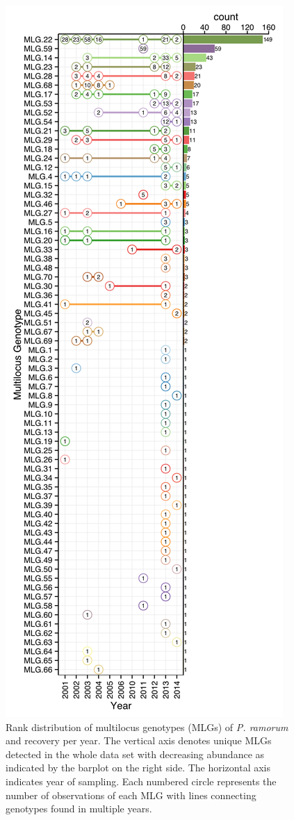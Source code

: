 \documentclass[double,11pt]{beavtex}
\begin{document}
  \begin{figure}
  
  {\centering \includegraphics[width=0.4\linewidth]{figure/phytopathology/figure_2} 
  
  }
  
  \caption[Rank distribution of multilocus genotypes (MLGs) of \emph{P. ramorum}
  and recovery per year.]{Rank distribution of multilocus genotypes (MLGs) of \emph{P. ramorum}
  and recovery per year. The vertical axis denotes unique MLGs detected in
  the whole data set with decreasing abundance as indicated by the barplot
  on the right side. The horizontal axis indicates year of sampling. Each
  numbered circle represents the number of observations of each MLG with
  lines connecting genotypes found in multiple years.}\label{fig:ramorum2}
  \end{figure}
  
  \newpage
  
\end{document}

